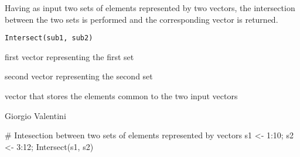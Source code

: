 \documentclass{article}
\begin{document}
\begin{Description}\relax
Having as input two sets of elements represented by two vectors, the intersection between the two sets is performed and
the corresponding vector is returned.
\end{Description}
\begin{Usage}
\begin{verbatim}
Intersect(sub1, sub2)
\end{verbatim}
\end{Usage}
\begin{Arguments}
\begin{ldescription}
\item[\code{sub1}] first vector representing the first set 
\item[\code{sub2}] second vector representing the second set 
\end{ldescription}
\end{Arguments}
\begin{Value}
vector that stores the elements common to the two input vectors
\end{Value}
\begin{Author}\relax
Giorgio Valentini 
\end{Author}
\begin{Examples}
\begin{ExampleCode}
# Intesection between two sets of elements represented by vectors
s1 <- 1:10;
s2 <- 3:12;
Intersect(s1, s2)
\end{ExampleCode}
\end{Examples}
\end{document}
